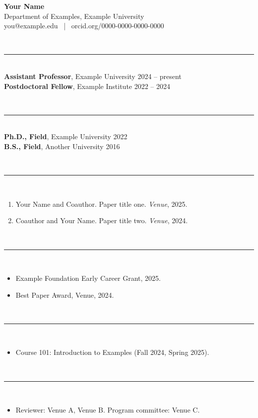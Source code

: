 \documentclass[11pt]{article}
\newcommand{\sect}[1]{\vspace{12pt}{\large\bfseries #1}\\[-7pt]\rule{\linewidth}{0.4pt}\\[4pt]}
\begin{document}
\begin{center}
{\LARGE\bfseries Your Name}\\[3pt]
Department of Examples, Example University\\
you@example.edu \, | \, orcid.org/0000-0000-0000-0000
\end{center}

\sect{Appointments}
\textbf{Assistant Professor}, Example University \hfill 2024 -- present\\
\textbf{Postdoctoral Fellow}, Example Institute \hfill 2022 -- 2024

\sect{Education}
\textbf{Ph.D., Field}, Example University \hfill 2022\\
\textbf{B.S., Field}, Another University \hfill 2016

\sect{Publications}
\begin{enumerate}[leftmargin=1.6em]
  \item Your Name and Coauthor. Paper title one. \textit{Venue}, 2025.
  \item Coauthor and Your Name. Paper title two. \textit{Venue}, 2024.
\end{enumerate}

\sect{Grants and Awards}
\begin{itemize}
  \item Example Foundation Early Career Grant, 2025.
  \item Best Paper Award, Venue, 2024.
\end{itemize}

\sect{Teaching}
\begin{itemize}
  \item Course 101: Introduction to Examples (Fall 2024, Spring 2025).
\end{itemize}

\sect{Service}
\begin{itemize}
  \item Reviewer: Venue A, Venue B. Program committee: Venue C.
\end{itemize}
\end{document}
